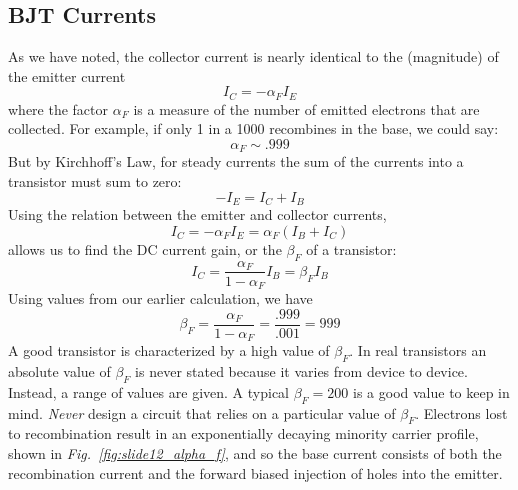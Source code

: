 \subsection{BJT Currents}
As we have noted, the collector current is nearly identical to the (magnitude) of the emitter current 
    \begin{equation}
        {I_C} =  - {\alpha_F}{I_E}
    \end{equation}
where the factor $\alpha_F$  is a measure of the number of emitted electrons that are collected.  For example, if only 1 in a 1000 recombines in the base, we could say:
    \begin{equation}
        {\alpha _F} \sim .999
    \end{equation}
But by Kirchhoff's Law, for steady currents the sum of the currents into a transistor must sum to zero:
    \begin{equation} 
        - {I_E} = {I_C} + {I_B}
    \end{equation}
Using the relation between the emitter and collector currents,
    \begin{equation}
        {I_C} =  - {\alpha _F}{I_E} = {\alpha _F}({I_B} + {I_C})
    \end{equation}
allows us to find the DC current gain, or the $\beta_F$ of a transistor:
    \begin{equation}
        {I_C} = \frac{{{\alpha _F}}}{{1 - {\alpha _F}}}{I_B} = {\beta _F}{I_B}
    \end{equation}
Using values from our earlier calculation, we have
    \begin{equation}
        {\beta _F} = \frac{{{\alpha _F}}}{{1 - {\alpha _F}}} = \frac{{.999}}{{.001}} = 999
    \end{equation}
A good transistor is characterized by a high value of $\beta_F$.  In real transistors an absolute value of $\beta_F$ is never stated because it varies from device to device.  Instead, a range of values are given.  A typical $\beta_F =200$ is a good value to keep in mind. \emph{Never} design a circuit that relies on a particular value of $\beta_F$.  
Electrons lost to recombination result in an exponentially decaying minority carrier profile, shown in \emph{Fig.~\ref{fig:slide12_alpha_f}}, and so the base current consists of both the recombination current and the forward biased  injection of holes into the emitter. 
